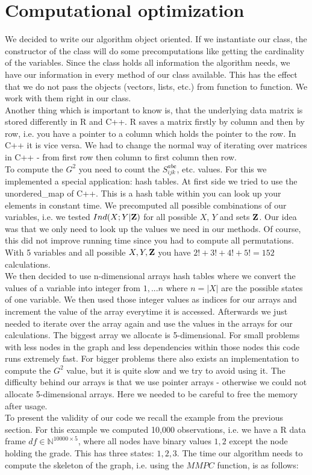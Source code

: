 	\section{Computational optimization}

		We decided to write our algorithm object oriented. If we instantiate our class, the constructor of the class will do some precomputations like getting the cardinality of the variables. Since the class holds all information the algorithm needs, we have our information in every method of our class available. This has the effect that we do not pass the objects (vectors, lists, etc.) from function to function. We work with them right in our class.\\
		Another thing which is important to know is, that the underlying data matrix is stored differently in R and C++. R saves a matrix firstly by column and then by row, i.e. you have a pointer to a column which holds the pointer to the row. In C++ it is vice versa. We had to change the normal way of iterating over matrices in C++ - from first row then column to first column then row.\\
		To compute the $G^{2}$ you need to count the $S^{ab\textbf{c}}_{ijk}$, etc. values. For this we implemented a special application: hash tables. At first side we tried to use the unordered\_map of C++. This is a hash table within you can look up your elements in constant time. We precomputed all possible combinations of our variables, i.e. we tested $Ind(X;Y | {\textbf{Z}})$ for all possible $X$, $Y$ and sets ${\textbf{Z}}$. Our idea was that we only need to look up the values we need in our methods. Of course, this did not improve running time since you had to compute all permutations. With 5 variables and all possible $X, Y, {\textbf{Z}}$ you have $2! + 3! + 4! + 5! = 152$ calculations.\\
		We then decided to use n-dimensional arrays hash tables where we convert the values of a variable into integer from $1,...n$ where $n = |X|$ are the possible states of one variable. We then used those integer values as indices for our arrays and increment the value of the array everytime it is accessed. Afterwards we just needed to iterate over the array again and use the values in the arrays for our calculations. The biggest array we allocate is 5-dimensional. For small problems with less nodes in the graph and less dependencies within those nodes this code runs extremely fast. For bigger problems there also exists an implementation to compute the $G^{2}$ value, but it is quite slow and we try to avoid using it. The difficulty behind our arrays is that we use pointer arrays - otherwise we could not allocate 5-dimensional arrays. Here we needed to be careful to free the memory after usage.\\
		To present the validity of our code we recall the example from the previous section. For this example we computed 10,000 observations, i.e. we have a R data frame $df \in \mathbb{N}^{10000 \times 5}$, where all nodes have binary values $1, 2$ except the node holding the grade. This has three states: $1, 2, 3$. The time our algorithm needs to compute the skeleton of the graph, i.e. using the $MMPC$ function, is as follows:


